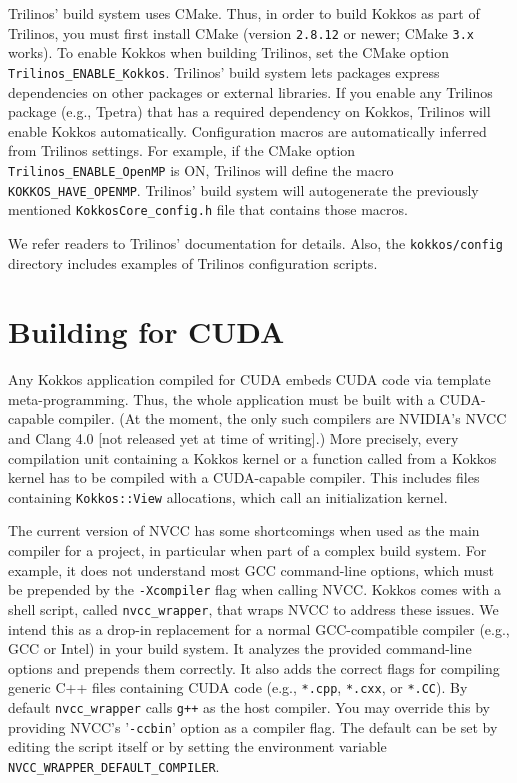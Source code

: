 Trilinos' build system uses CMake.  Thus, in order to build Kokkos as
part of Trilinos, you must first install CMake (version
\texttt{2.8.12} or newer; CMake \texttt{3.x} works).  
To enable Kokkos when building Trilinos, set the CMake option \verb!Trilinos_ENABLE_Kokkos!.
Trilinos' build system lets packages express dependencies on other packages or external libraries.
If you enable any Trilinos package (e.g., Tpetra) that has a required dependency on Kokkos, 
Trilinos will enable Kokkos automatically.
Configuration macros are automatically inferred from Trilinos settings. 
For example, if the CMake option \lstinline|Trilinos_ENABLE_OpenMP| is ON, Trilinos will define the macro \lstinline|KOKKOS_HAVE_OPENMP|.
Trilinos' build system will autogenerate the previously mentioned \lstinline|KokkosCore_config.h| file that contains those macros. 

We refer readers to Trilinos' documentation for details.  Also, the
\texttt{kokkos/config} directory includes examples of Trilinos
configuration scripts.
 
\section{Building for CUDA}\label{S:build:CUDA}

Any Kokkos application compiled for CUDA embeds CUDA code via template meta-programming.
Thus, the whole application must be built with a CUDA-capable compiler.
(At the moment, the only such compilers are NVIDIA's NVCC and Clang 4.0 [not released yet at time of writing].)
More precisely, every compilation unit containing a Kokkos kernel or a function called from a Kokkos kernel has to be compiled with a CUDA-capable compiler. 
This includes files containing \lstinline|Kokkos::View| allocations, which call an initialization kernel. 

The current version of NVCC has some shortcomings when used as the main compiler for a project, in particular when part of a complex build system.
For example, it does not understand most GCC command-line options, which must be prepended by the \lstinline|-Xcompiler| flag when calling NVCC. 
Kokkos comes with a shell script, called \lstinline|nvcc_wrapper|, that wraps NVCC to address these issues.
We intend this as a drop-in replacement for a normal GCC-compatible compiler (e.g., GCC or Intel) in your build system.
It analyzes the provided command-line options and prepends them correctly. 
It also adds the correct flags for compiling generic C++ files containing CUDA code (e.g., \verb!*.cpp!, \verb!*.cxx!, or \verb!*.CC!).
By default \lstinline|nvcc_wrapper| calls \verb!g++! as the host compiler.
You may override this by providing NVCC's '\lstinline|-ccbin|' option as a compiler flag.
The default can be set by editing the script itself or by setting the environment variable \lstinline|NVCC_WRAPPER_DEFAULT_COMPILER|.

